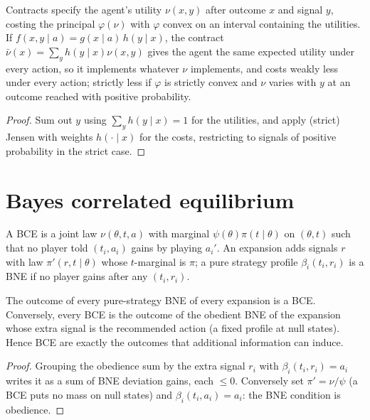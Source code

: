 \begin{theorem}
\label{thm:informativeness}
\leanok
Contracts specify the agent's utility $\nu(x,y)$ after outcome $x$ and signal $y$, costing the principal
$\varphi(\nu)$ with $\varphi$ convex on an interval containing the utilities. If $f(x,y \mid a) = g(x \mid a)\,h(y \mid x)$,
the contract $\bar\nu(x) = \sum_y h(y \mid x)\nu(x,y)$ gives the agent the same expected utility under every action,
so it implements whatever $\nu$ implements, and costs weakly less under every action; strictly less if $\varphi$ is
strictly convex and $\nu$ varies with $y$ at an outcome reached with positive probability.
\end{theorem}
\begin{proof}
\leanok
Sum out $y$ using $\sum_y h(y\mid x) = 1$ for the utilities, and apply (strict) Jensen with weights $h(\cdot \mid x)$
for the costs, restricting to signals of positive probability in the strict case.
\end{proof}

\section{Bayes correlated equilibrium}
\label{sec:bce}

\begin{definition}
\label{def:bce}
\leanok
A BCE is a joint law $\nu(\theta, t, a)$ with marginal $\psi(\theta)\pi(t\mid\theta)$ on $(\theta,t)$ such that no
player told $(t_i, a_i)$ gains by playing $a_i'$. An expansion adds signals $r$ with law $\pi'(r, t\mid\theta)$ whose
$t$-marginal is $\pi$; a pure strategy profile $\beta_i(t_i, r_i)$ is a BNE if no player gains after any $(t_i, r_i)$.
\end{definition}

\begin{theorem}
\label{thm:bce}
\leanok
{}
The outcome of every pure-strategy BNE of every expansion is a BCE. Conversely, every BCE is the outcome of the
obedient BNE of the expansion whose extra signal is the recommended action (a fixed profile at null states). Hence BCE are exactly
the outcomes that additional information can induce.
\end{theorem}
\begin{proof}
\leanok
Grouping the obedience sum by the extra signal $r_i$ with $\beta_i(t_i, r_i) = a_i$ writes it as a sum of BNE
deviation gains, each $\le 0$. Conversely set $\pi' = \nu/\psi$ (a BCE puts no mass on null states) and $\beta_i(t_i, a_i) = a_i$: the BNE condition is
obedience.
\end{proof}

